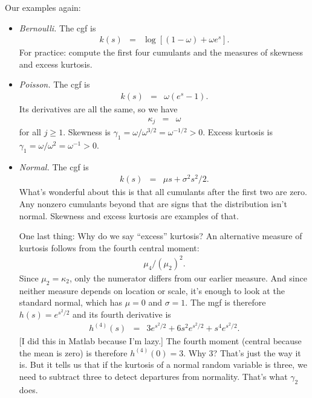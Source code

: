 Our examples again:
%
\begin{itemize}
\item {\it Bernoulli.\/}
The cgf is
\begin{eqnarray*}
    k(s) &=& \log \left[ (1-\omega) + \omega e^{s} \right] .
\end{eqnarray*}
For practice:  compute the first four cumulants and the
measures of skewness and excess kurtosis.

\item {\it Poisson.\/}  The cgf is
\begin{eqnarray*}
    k(s) &=& \omega (e^{s}-1)  .
\end{eqnarray*}
Its derivatives are all the same, so we have
\begin{eqnarray*}
    \kappa_j &=& \omega
\end{eqnarray*}
for all $j\geq 1$.
Skewness is $\gamma_1 = \omega/\omega^{3/2} = \omega^{-1/2} > 0$.
Excess kurtosis is
$\gamma_1 = \omega/\omega^{2} = \omega^{-1} > 0$.


\item {\it Normal.\/}
The cgf is
\begin{eqnarray*}
        k(s) &=& \mu s + \sigma^2 s^2/2  .
\end{eqnarray*}
What's wonderful about this is that all cumulants after the first two are
zero.
Any nonzero cumulants beyond that are signs
that the distribution isn't normal.
Skewness and excess kurtosis are examples of that.

One last thing:  Why do we say ``excess'' kurtosis?
An alternative measure of kurtosis
follows from the fourth central moment:
\begin{eqnarray*}
    \mu_4 /(\mu_2)^2 .
\end{eqnarray*}
Since $\mu_2 = \kappa_2$, only the numerator differs
from our earlier measure.
And since neither measure depends on location or scale,
it's enough to look at the standard normal,
which has $\mu = 0$ and $\sigma = 1$.
The mgf is therefore $h(s) = e^{s^2/2}$ and its fourth derivative is
\begin{eqnarray*}
    h^{(4)}(s) &=& 3 e^{s^2/2} + 6 s^2 e^{s^2/2} + s^4 e^{s^2/2} .
\end{eqnarray*}
[I did this in Matlab because I'm lazy.]
The fourth moment (central because the mean is zero) is
therefore $ h^{(4)}(0) = 3$.
Why 3?  That's just the way it is.
But it tells us that if the kurtosis of a normal random variable is three,
we need to subtract three to detect departures from normality.
That's what $\gamma_2$ does.
\end{itemize}

